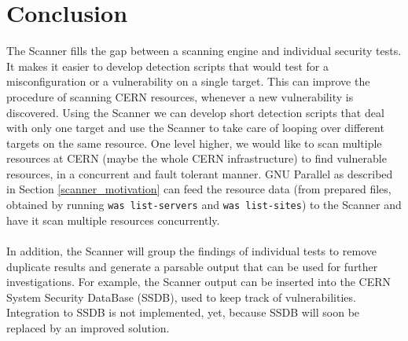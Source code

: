 \section{Conclusion}
The Scanner fills the gap between a scanning engine and individual security tests. It makes it easier to develop detection scripts that would test for a misconfiguration or a vulnerability on a single target. This can improve the procedure of scanning CERN resources, whenever a new vulnerability is discovered. Using the Scanner we can develop short detection scripts that deal with only one target and use the Scanner to take care of looping over different targets on the same resource. One level higher, we would like to scan multiple resources at CERN (maybe the whole CERN infrastructure) to find vulnerable resources, in a concurrent and fault tolerant manner. GNU Parallel as described in Section \ref{scanner_motivation} can feed the resource data (from prepared files, obtained by running \texttt{was list-servers} and \texttt{was list-sites}) to the Scanner and have it scan multiple resources concurrently.
\paragraph{}
In addition, the Scanner will group the findings of individual tests to remove duplicate results and generate a parsable output that can be used for further investigations. For example, the Scanner output can be inserted into the CERN System Security DataBase (SSDB), used to keep track of vulnerabilities. Integration to SSDB is not implemented, yet, because SSDB will soon be replaced by an improved solution. 

